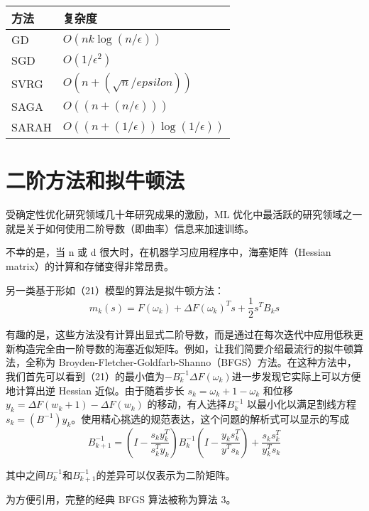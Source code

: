 \documentclass{book}
\begin{document}
\begin{tabular}{ll}\label{最小化一般凸函数的一阶方法计算复杂度}
	方法&复杂度\\
	\hline
	GD&$O(nk\log(n/\epsilon))$\\
	SGD&$O(1/\epsilon^2)$\\
	SVRG&$O(n+(\sqrt{n}/epsilon))$\\
	SAGA&$O((n+(n/\epsilon)))$\\
	SARAH&$O((n+(1/\epsilon))\log(1/\epsilon))$
\end{tabular}

\section{二阶方法和拟牛顿法}

受确定性优化研究领域几十年研究成果的激励，ML 优化中最活跃的研究领域之一就是关于如何使用二阶导数（即曲率）信息来加速训练。

不幸的是，当 n 或 d 很大时，在机器学习应用程序中，海塞矩阵（Hessian matrix）的计算和存储变得非常昂贵。

另一类基于形如（21）模型的算法是拟牛顿方法：
\begin{equation}\label{eq:optimizer9}
	m_k(s)=F(\omega_k)+\Delta F(\omega_k)^Ts+\frac{1}{2}s^TB_ks
\end{equation}

有趣的是，这些方法没有计算出显式二阶导数，而是通过在每次迭代中应用低秩更新构造完全由一阶导数的海塞近似矩阵。例如，让我们简要介绍最流行的拟牛顿算法，全称为 Broyden-Fletcher-Goldfarb-Shanno（BFGS）方法。在这种方法中，我们首先可以看到（21）的最小值为$-B_k^{-1}\Delta F(\omega_k)$进一步发现它实际上可以方便地计算出逆 Hessian 近似。由于随着步长 $s_k = \omega_k+1 − \omega_k$ 和位移$y_k=\Delta F(w_k+1)-\Delta F(w_k)$ 的移动，有人选择$B_k^{-1}$ 以最小化以满足割线方程$ s_k = (B^{-1})y_k$。使用精心挑选的规范表达，这个问题的解析式可以显示的写成
\begin{equation}\label{eq:optimizer10}
	B_{k+1}^{-1}=(I-\frac{s_ky_k^T}{s_k^Ty_k})B_k^{-1}(I-\frac{y_ks_k^T}{y^Ts_k})+\frac{s_ks_k^T}{y_k^Ts_k}
\end{equation}

其中之间$B_k^{-1}$和$B_{k+1}^{-1}$的差异可以仅表示为二阶矩阵。

为方便引用，完整的经典 BFGS 算法被称为算法 3。
\end{document}
